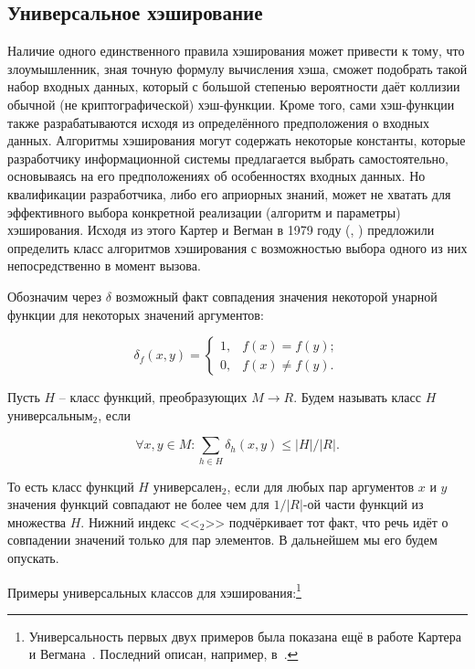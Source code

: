 \subsection{Универсальное хэширование}\label{sec:universal-hashing}
Наличие одного единственного правила хэширования может привести к тому, что злоумышленник, зная точную формулу вычисления хэша, сможет подобрать такой набор входных данных, который с большой степенью вероятности даёт коллизии обычной (не криптографической) хэш-функции. Кроме того, сами хэш-функции также разрабатываются исходя из определённого предположения о входных данных. Алгоритмы хэширования могут содержать некоторые константы, которые разработчику информационной системы предлагается выбрать самостоятельно, основываясь на его предположениях об особенностях входных данных. Но квалификации разработчика, либо его априорных знаний, может не хватать для эффективного выбора конкретной реализации (алгоритм и параметры) хэширования. Исходя из этого Картер и Вегман в 1979 году (, \cite{Carter:Wegman:1979}) предложили определить класс алгоритмов хэширования с возможностью выбора одного из них непосредственно в момент вызова.

Обозначим через $\delta$ возможный факт совпадения значения некоторой унарной функции для некоторых значений аргументов:

\[
\delta_{f}( x, y ) = \left\{\begin{matrix}
1, & f(x) = f(y);\\ 
0, & f(x) \neq f(y).
\end{matrix}\right.
\]

Пусть $H$ -- класс функций, преобразующих $M \to R$. Будем называть класс $H$ универсальным$_{2}$, если

\[
\forall x, y \in M: \sum_{h \in H} \delta_{h}( x, y ) \leq |H| / |R|.
\]

То есть класс функций $H$ универсален$_{2}$, если для любых пар аргументов $x$ и $y$ значения функций совпадают не более чем для $1/|R|$-ой части функций из множества $H$. Нижний индекс <<$_{2}$>> подчёркивает тот факт, что речь идёт о совпадении значений только для пар элементов. В дальнейшем мы его будем опускать.

Примеры универсальных классов для хэширования:\footnote{Универсальность первых двух примеров была показана ещё в работе Картера и Вегмана~\cite{Carter:Wegman:1979}. Последний описан, например, в~\cite{Dietzfelbinger:Gil:Matias:Pippenger:1992}.}

